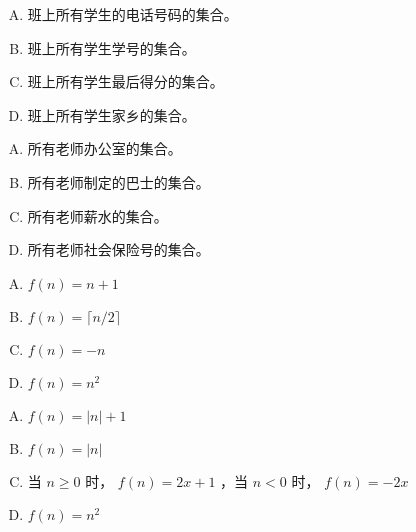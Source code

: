 {{        %
        \begin{practices}
            \begin{enumerate}[A.]
                \item 班上所有学生的电话号码的集合。
                \item 班上所有学生学号的集合。
                \item 班上所有学生最后得分的集合。
                \item 班上所有学生家乡的集合。
            \end{enumerate}
        \end{practices}

        \begin{practices}
            \begin{enumerate}[A.]
                \item 所有老师办公室的集合。
                \item 所有老师制定的巴士的集合。
                \item 所有老师薪水的集合。
                \item 所有老师社会保险号的集合。
            \end{enumerate}
        \end{practices}

        \begin{practices}
            \begin{enumerate}[A.]
                \item $f(n) = n + 1$
                \item $f(n) = \lceil n / 2 \rceil$
                \item $f(n) = -n$
                \item $f(n) = n^2$
            \end{enumerate}
        \end{practices}

        \begin{practices}
            \begin{enumerate}[A.]
                \item $f(n) = |n| + 1$
                \item $f(n) = |n|$
                \item 当 $n \geq 0$ 时， $f(n) = 2x + 1$ ，当 $n < 0$ 时， $f(n) = -2x$
                \item $f(n) = n^2$
            \end{enumerate}
        \end{practices}

}}
